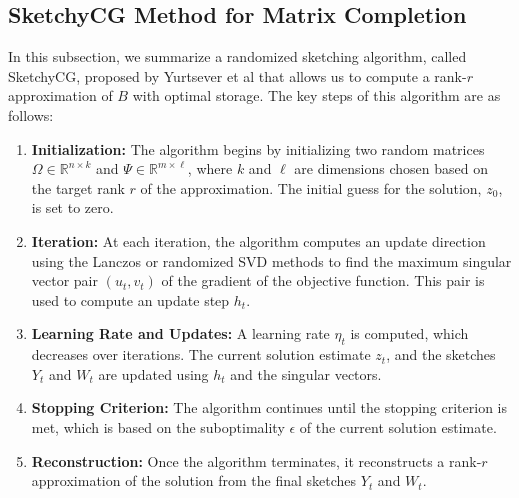 \documentclass[10pt, twocolumn, reqno, a4paper,oneside]{amsart}
\numberwithin{equation}{section}
\numberwithin{theorem}{section}
\numberwithin{figure}{section}
\numberwithin{table}{section}
\numberwithin{theorem}{section}
\numberwithin{equation}{section}
\begin{document}
\subsection{SketchyCG Method for Matrix Completion}
In this subsection, we summarize a randomized sketching algorithm, called SketchyCG, proposed by Yurtsever et al \cite{pmlr-v54-yurtsever17a} that allows us to compute a rank-$r$ approximation of $B$ with optimal storage. The key steps of this algorithm are as follows:

\begin{enumerate}
	\item \textbf{Initialization:} The algorithm begins by initializing two random matrices $\Omega \in \mathbb{R}^{n \times k}$ and $\Psi \in \mathbb{R}^{m \times \ell}$, where $k$ and $\ell$ are dimensions chosen based on the target rank $r$ of the approximation. The initial guess for the solution, $z_0$, is set to zero.

	\item \textbf{Iteration:} At each iteration, the algorithm computes an update direction using the Lanczos or randomized SVD methods to find the maximum singular vector pair $(u_t, v_t)$ of the gradient of the objective function. This pair is used to compute an update step $h_t$.

	\item \textbf{Learning Rate and Updates:} A learning rate $\eta_t$ is computed, which decreases over iterations. The current solution estimate $z_t$, and the sketches $Y_t$ and $W_t$ are updated using $h_t$ and the singular vectors.

	\item \textbf{Stopping Criterion:} The algorithm continues until the stopping criterion is met, which is based on the suboptimality $\epsilon$ of the current solution estimate.

	\item \textbf{Reconstruction:} Once the algorithm terminates, it reconstructs a rank-$r$ approximation of the solution from the final sketches $Y_t$ and $W_t$.
\end{enumerate}
\end{document}
